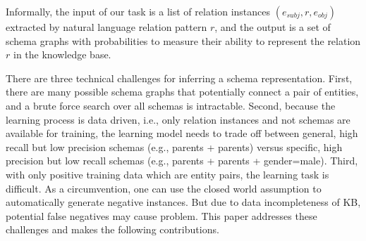Informally, the input of our task is a list of relation instances
$(e_{subj}, r, e_{obj})$ extracted by natural language relation pattern $r$,
and the output is a set of schema graphs with probabilities to measure
their ability to represent the relation $r$ in the knowledge base.


There are three technical challenges for inferring a schema representation.
First, there are many possible schema graphs that potentially
connect a pair of entities, and a brute force search over all schemas
is intractable.
Second, because the learning process is data driven, i.e.,
only relation instances and not schemas are available for training,
the learning model needs to trade off between general, high recall but
low precision schemas (e.g., parents + parents) versus specific, high
precision but low recall schemas (e.g., parents + parents + gender=male).
Third, with only positive training data which are entity pairs,
the learning task is difficult.
As a circumvention, one can use the closed world assumption to automatically
generate negative instances. But due to data incompleteness of KB,
potential false negatives may cause problem.
This paper addresses these challenges and makes the following contributions.

%

